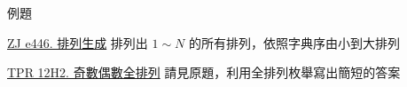 \documentclass[aspectratio=169]{beamer}
\begin{document}
    \begin{frame}{例題}
        \begin{block}{\href{https://zerojudge.tw/ShowProblem?problemid=e446}{ZJ e446. 排列生成}}
            排列出 $1 \sim N$ 的所有排列，依照字典序由小到大排列
        \end{block}

        \begin{block}{\href{https://codeforces.com/group/H0qY3QmnOW/contest/339497/problem/H2}{TPR 12H2. 奇數偶數全排列}}
            請見原題，利用全排列枚舉寫出簡短的答案
        \end{block}
    \end{frame}
\end{document}
